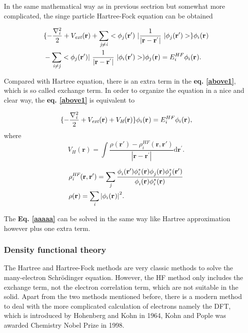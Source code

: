 \documentclass[a4paper, 12pt, titlepage,oneside,drop]{kthesis}
\begin{document}
In the same mathematical way as in previous sectrion but somewhat more complicated, the singe particle Hartree-Fock equation can be obtained

\begin{equation}\begin{split}\label{above1}
& \{ -\frac{\nabla^{2}_{\textit i}}{2} + V_\textit{ext}(\textbf{r})+ \suminj<j><i> <\bwfn<j><'>\ | \frac{1}{|\textbf{r} - \textbf{r}^{'} |} \ | \bwfn<j><'>> \} \bwff<i><>  \\
& - \suminj<i><j>  < \bwfn<j><'>|\ \frac{1}{|\textbf{r} - \textbf{r}^{'} |} \ | \bwfn<i><'> >) \bwfn<j><>  = E_{i}^{HF} \bwff<i><>.
\end{split}\end{equation}

Compared with Hartree equation, there is an extra term in the \textbf{eq. \ref{above1}}, which is so called exchange term. In order to organize the equation in a nice and clear way, the \textbf{eq. \ref{above1}} is equivalent to

\begin{equation}\label{aaaaa}\begin{split}
\{ -\frac{\nabla^{2}_{\textit i}}{2} + V_\textit{ext}(\textbf{r}) +V_\textit{H}(\textbf{r}) \}  \bwff<i><>  = E_{i}^{HF}   \bwff<i><>, 
\end{split}\end{equation}
where
\begin{equation}
 V_\textit{H}(\textbf{r})= \int \frac{\rho(\textbf{r}{'}) - \rho_{\textit{i}}^{\textit{HF}}(\textbf{r},\textbf{r}{'})}{|\textbf{r} - \textbf{r}^{'} |}  \mathrm{d}\textbf{r}^{'}.
\end{equation}

\begin{equation}
\begin{split}
& \rho_{\textit{i}}^{\textit{HF}}(\textbf{r},\textbf{r}{'}) = \sumi<j> \frac{\phi_{i}^{}(\textbf{r}{'}) \phi_{i}^{*}(\textbf{r}{}) \phi_{j}^{}(\textbf{r}{}) \phi_{j}^{*}(\textbf{r}{'})} {\phi_{i}^{}(\textbf{r}) \phi_{i}^{*}(\textbf{r})}  \\
& \rho(\textbf{r}) = \sumi<i>  {|\bwff<i><>|}^{2}.
\end{split}
\end{equation}

The \textbf{Eq. \ref{aaaaa}} can be solved in the same way like Hartree approximation however plus one extra term.

\subsubsection{Density functional theory}
The Hartree and Hartree-Fock methods are very classic methods to solve the many-electron 
 Schrödinger equation. However, the HF method only includes the exchange term, not the electron correlation term, which are not suitable in the solid.
 Apart from the two methods mentioned before, there is a modern method to deal with
 the more complicated calculation of electrons namely the DFT, which is introduced by Hohenberg and
 Kohn in 1964, Kohn and Pople was awarded Chemistry Nobel Prize in 1998.
\end{document}

